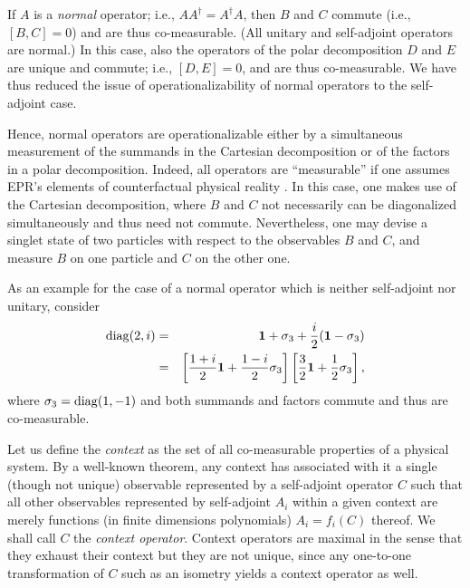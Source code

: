 If $A$ is a {\em normal} operator;
i.e.,  $AA^\dagger=A^\dagger A$, then
$B$ and $C$ commute (i.e., $[B,C]=0$)
and are thus co-measurable.
(All unitary and self-adjoint operators are normal.)
In this case, also the operators of the polar decomposition $D$ and $E$
are unique and commute;
i.e.,    $[D,E]=0$, and are thus co-measurable.
We have thus reduced the issue of operationalizability of normal operators
to the self-adjoint case.

Hence,  normal operators are  operationalizable
either by a simultaneous measurement of the summands in the Cartesian decomposition or
of the factors in a polar decomposition.
Indeed, all operators are ``measurable''
if one assumes EPR's elements of counterfactual
physical reality   \cite[p. 108f]{svozil-ql}.
In this case, one makes use of the Cartesian decomposition, where $B$ and $C$
not necessarily
can be diagonalized simultaneously and thus need not commute.
Nevertheless, one may devise a singlet state of two particles with respect to the
observables $B$ and $C$, and measure $B$ on one particle and $C$ on the other one.

As an example for the case of a normal operator which is neither self-adjoint nor
unitary, consider
\begin{eqnarray}
{\rm diag}(2,i)
&=&
{\bf 1}+\sigma_3 +{i\over 2}({\bf 1} - \sigma_3) \nonumber \\
&=&
\left[
{1+i\over 2} {\bf 1}
+
{1-i\over 2} \sigma_3
\right]
\left[
{3\over 2} {\bf 1}
+
{1\over 2} \sigma_3
\right],
\end{eqnarray}
where $\sigma_3={\rm diag}(1,-1)$ and
both summands and factors commute and thus are co-measurable.


Let us define the {\em context}
as the set of all co-measurable properties of a physical system.
By a well-known theorem, any context has associated with it a
single (though not unique) observable represented by a self-adjoint operator $C$
such that all other observables represented by self-adjoint $A_i$
within a given context
are merely functions (in finite dimensions polynomials) $A_i=f_i(C)$
thereof. We shall call $C$ the {\em context operator}.
Context operators are maximal in the sense that they exhaust their context
but they are not unique, since any one-to-one transformation of $C$
such as an isometry yields a context operator as well.

